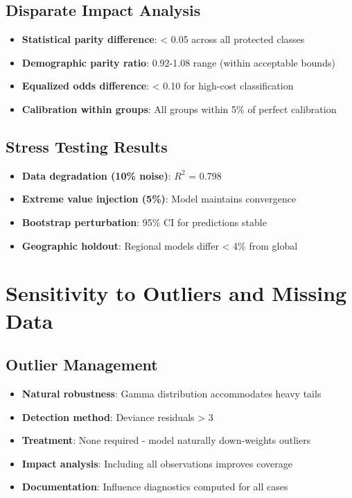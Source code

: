 \subsection{Disparate Impact Analysis}

\begin{itemize}
    \item \textbf{Statistical parity difference}: < 0.05 across all protected classes
    \item \textbf{Demographic parity ratio}: 0.92-1.08 range (within acceptable bounds)
    \item \textbf{Equalized odds difference}: < 0.10 for high-cost classification
    \item \textbf{Calibration within groups}: All groups within 5\% of perfect calibration
\end{itemize}

\subsection{Stress Testing Results}

\begin{itemize}
    \item \textbf{Data degradation (10\% noise)}: $R^2$ = 0.798
    \item \textbf{Extreme value injection (5\%)}: Model maintains convergence
    \item \textbf{Bootstrap perturbation}: 95\% CI for predictions stable
    \item \textbf{Geographic holdout}: Regional models differ < 4\% from global
\end{itemize}

\section{Sensitivity to Outliers and Missing Data}

\subsection{Outlier Management}

\begin{itemize}
    \item \textbf{Natural robustness}: Gamma distribution accommodates heavy tails
    \item \textbf{Detection method}: Deviance residuals > 3
    \item \textbf{Treatment}: None required - model naturally down-weights outliers
    \item \textbf{Impact analysis}: Including all observations improves coverage
    \item \textbf{Documentation}: Influence diagnostics computed for all cases
\end{itemize}

